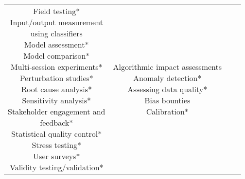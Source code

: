 \documentclass[fleqn]{article}
\begin{document}
\begin{landscape}
\begin{table}[H]
\begin{tabular}{|c|c|c|c|}
{			\textbullet\hspace{3pt} Field testing*\\  	
			\textbullet\hspace{3pt} Input/output measurement\\\hspace{10pt}using classifiers \\ 
			\textbullet\hspace{3pt} Model assessment*\\  	
			\textbullet\hspace{3pt} Model comparison*\\  	
			\textbullet\hspace{3pt} Multi-session experiments*\\  	
			\textbullet\hspace{3pt} Perturbation studies*\\  		
			\textbullet\hspace{3pt} Root cause analysis*\\  	
			\textbullet\hspace{3pt} Sensitivity analysis*\\  	
			\textbullet\hspace{3pt} Stakeholder engagement and\\\hspace{10pt}feedback*\\  	
			\textbullet\hspace{3pt} Statistical quality control*\\  	
			\textbullet\hspace{3pt} Stress testing*\\  		
			\textbullet\hspace{3pt} User surveys*\\  	
			\textbullet\hspace{3pt} Validity testing/validation*\\  
		}
		& \makecell[l]{
			\textbullet\hspace{3pt} Algorithmic impact assessments \\ 
			\textbullet\hspace{3pt} Anomaly detection*\\ 
			\textbullet\hspace{3pt} Assessing data quality*\\ 
			\textbullet\hspace{3pt} Bias bounties \\ 
			\textbullet\hspace{3pt} Calibration*\\ 
}
\end{tabular}
\end{table}
\end{landscape}
\end{document}
